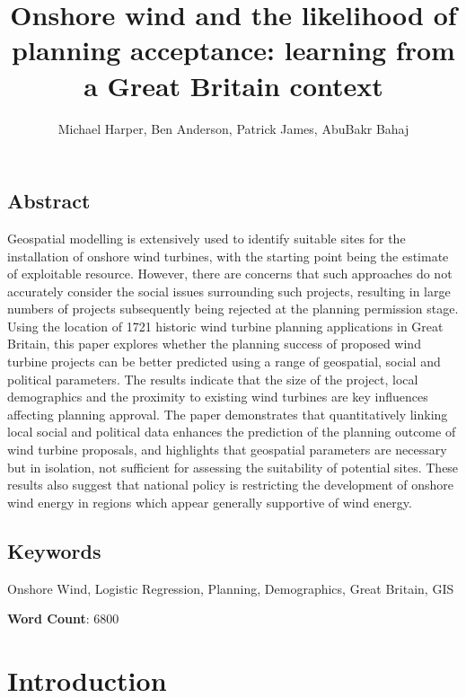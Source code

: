 \documentclass[a4paper,]{article}
\title{Onshore wind and the likelihood of planning acceptance: learning from a
Great Britain context}
\author{Michael Harper, Ben Anderson, Patrick James, AbuBakr Bahaj}
\date{}
\theoremstyle{definition}
\theoremstyle{definition}
\theoremstyle{definition}
\theoremstyle{remark}
\begin{document}
\maketitle

\hypertarget{abstract}{%
\subsection*{Abstract}\label{abstract}}

Geospatial modelling is extensively used to identify suitable sites for
the installation of onshore wind turbines, with the starting point being
the estimate of exploitable resource. However, there are concerns that
such approaches do not accurately consider the social issues surrounding
such projects, resulting in large numbers of projects subsequently being
rejected at the planning permission stage. Using the location of 1721
historic wind turbine planning applications in Great Britain, this paper
explores whether the planning success of proposed wind turbine projects
can be better predicted using a range of geospatial, social and
political parameters. The results indicate that the size of the project,
local demographics and the proximity to existing wind turbines are key
influences affecting planning approval. The paper demonstrates that
quantitatively linking local social and political data enhances the
prediction of the planning outcome of wind turbine proposals, and
highlights that geospatial parameters are necessary but in isolation,
not sufficient for assessing the suitability of potential sites. These
results also suggest that national policy is restricting the development
of onshore wind energy in regions which appear generally supportive of
wind energy.

\hypertarget{keywords}{%
\subsection*{Keywords}\label{keywords}}

Onshore Wind, Logistic Regression, Planning, Demographics, Great
Britain, GIS

\textbf{Word Count}: 6800

\hypertarget{introduction}{%
\section{Introduction}\label{introduction}}
\end{document}
